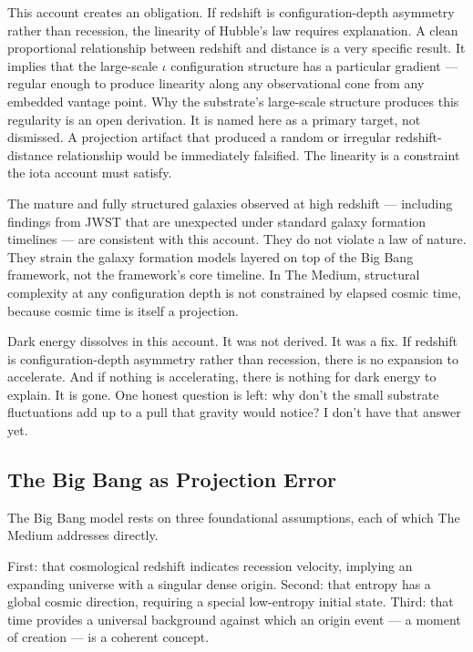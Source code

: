 \documentclass[11pt,letterpaper]{article}
\begin{document}
This account creates an obligation. If redshift is configuration-depth asymmetry rather than recession, the linearity of Hubble's law requires explanation. A clean proportional relationship between redshift and distance is a very specific result. It implies that the large-scale \(\iota\) configuration structure has a particular gradient --- regular enough to produce linearity along any observational cone from any embedded vantage point. Why the substrate's large-scale structure produces this regularity is an open derivation. It is named here as a primary target, not dismissed. A projection artifact that produced a random or irregular redshift-distance relationship would be immediately falsified. The linearity is a constraint the iota account must satisfy.

The mature and fully structured galaxies observed at high redshift --- including findings from JWST that are unexpected under standard galaxy formation timelines --- are consistent with this account. They do not violate a law of nature. They strain the galaxy formation models layered on top of the Big Bang framework, not the framework's core timeline. In The Medium, structural complexity at any configuration depth is not constrained by elapsed cosmic time, because cosmic time is itself a projection.

Dark energy dissolves in this account. It was not derived. It was a fix. If redshift is configuration-depth asymmetry rather than recession, there is no expansion to accelerate. And if nothing is accelerating, there is nothing for dark energy to explain. It is gone. One honest question is left: why don't the small substrate fluctuations add up to a pull that gravity would notice? I don't have that answer yet.

\subsection{The Big Bang as Projection Error}
\label{sec:org14b7403}

The Big Bang model rests on three foundational assumptions, each of which The Medium addresses directly.

First: that cosmological redshift indicates recession velocity, implying an expanding universe with a singular dense origin. Second: that entropy has a global cosmic direction, requiring a special low-entropy initial state. Third: that time provides a universal background against which an origin event --- a moment of creation --- is a coherent concept.
\end{document}
